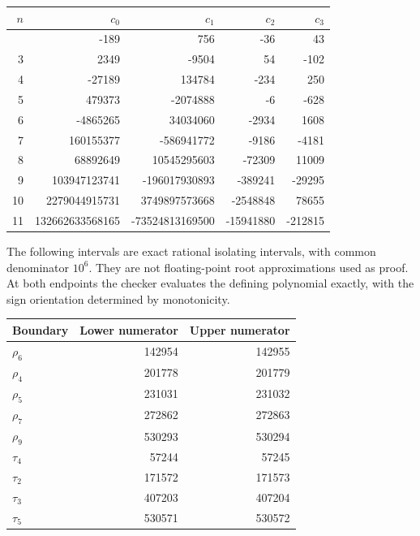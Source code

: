 \documentclass[
  11pt,
  a4paper,
]{article}
\begin{document}
\begin{longtable}[]{@{}rrrrr@{}}
\toprule\noalign{}
\(n\) & \(c_0\) & \(c_1\) & \(c_2\) & \(c_3\) \\
\midrule\noalign{}
\endhead
\bottomrule\noalign{}
\endlastfoot
2 & -189 & 756 & -36 & 43 \\
3 & 2349 & -9504 & 54 & -102 \\
4 & -27189 & 134784 & -234 & 250 \\
5 & 479373 & -2074888 & -6 & -628 \\
6 & -4865265 & 34034060 & -2934 & 1608 \\
7 & 160155377 & -586941772 & -9186 & -4181 \\
8 & 68892649 & 10545295603 & -72309 & 11009 \\
9 & 103947123741 & -196017930893 & -389241 & -29295 \\
10 & 2279044915731 & 3749897573668 & -2548848 & 78655 \\
11 & 132662633568165 & -73524813169500 & -15941880 & -212815 \\
\end{longtable}

The following intervals are exact rational isolating intervals, with
common denominator \(10^6\). They are not floating-point root
approximations used as proof. At both endpoints the checker evaluates
the defining polynomial exactly, with the sign orientation determined by
monotonicity.

\begin{longtable}[]{@{}lrr@{}}
\toprule\noalign{}
Boundary & Lower numerator & Upper numerator \\
\midrule\noalign{}
\endhead
\bottomrule\noalign{}
\endlastfoot
\(\rho_6\) & 142954 & 142955 \\
\(\rho_4\) & 201778 & 201779 \\
\(\rho_5\) & 231031 & 231032 \\
\(\rho_7\) & 272862 & 272863 \\
\(\rho_9\) & 530293 & 530294 \\
\(\tau_4\) & 57244 & 57245 \\
\(\tau_2\) & 171572 & 171573 \\
\(\tau_3\) & 407203 & 407204 \\
\(\tau_5\) & 530571 & 530572 \\
\end{longtable}
\end{document}
